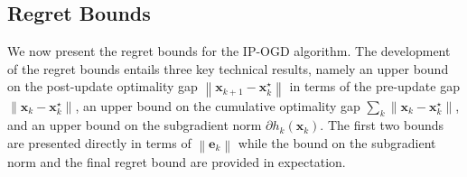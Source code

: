 \documentclass[draftcls,onecolumn,12pt]{IEEEtran}
\theoremstyle{plain}
\def\x{\mathbf{x}}
\def\e{\mathbf{e}}
\def\xks{\x_k^\star}
\providecommand{\norm}[1]{\left\|#1\right\|}
\theoremstyle{plain}
\theoremstyle{remark}
\begin{document}
						
						
\subsection{Regret Bounds}\label{vr} 
We now present the regret bounds for the IP-OGD algorithm. The development of the regret bounds entails three key technical results, namely an upper bound on the post-update optimality gap $\norm{\x_{k+1}-\xks}$ in terms of the pre-update gap ${\norm{\x_{k}-\xks}}$, an upper bound on the cumulative optimality gap $\sum_k \norm{\x_k-\xks}$, and an upper bound on the subgradient norm $\partial h_k(\x_k)$. The first two bounds are presented directly in terms of $\norm{\e_k}$ while the bound on the subgradient norm and the final regret bound are provided in expectation. 
\end{document}
